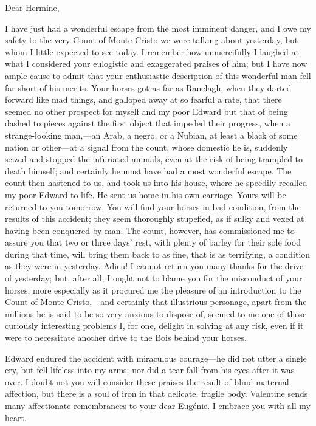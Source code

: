 \begin{mail}{}{Dear Hermine,}
	
	I have just had a wonderful escape from the most imminent danger, and I owe my safety to the very Count of Monte Cristo we were talking about yesterday, but whom I little expected to see today. I remember how unmercifully I laughed at what I considered your eulogistic and exaggerated praises of him; but I have now ample cause to admit that your enthusiastic description of this wonderful man fell far short of his merits. Your horses got as far as Ranelagh, when they darted forward like mad things, and galloped away at so fearful a rate, that there seemed no other prospect for myself and my poor Edward but that of being dashed to pieces against the first object that impeded their progress, when a strange-looking man,—an Arab, a negro, or a Nubian, at least a black of some nation or other—at a signal from the count, whose domestic he is, suddenly seized and stopped the infuriated animals, even at the risk of being trampled to death himself; and certainly he must have had a most wonderful escape. The count then hastened to us, and took us into his house, where he speedily recalled my poor Edward to life. He sent us home in his own carriage. Yours will be returned to you tomorrow. You will find your horses in bad condition, from the results of this accident; they seem thoroughly stupefied, as if sulky and vexed at having been conquered by man. The count, however, has commissioned me to assure you that two or three days' rest, with plenty of barley for their sole food during that time, will bring them back to as fine, that is as terrifying, a condition as they were in yesterday.  Adieu! I cannot return you many thanks for the drive of yesterday; but, after all, I ought not to blame you for the misconduct of your horses, more especially as it procured me the pleasure of an introduction to the Count of Monte Cristo,—and certainly that illustrious personage, apart from the millions he is said to be so very anxious to dispose of, seemed to me one of those curiously interesting problems I, for one, delight in solving at any risk, even if it were to necessitate another drive to the Bois behind your horses. 

 Edward endured the accident with miraculous courage—he did not utter a single cry, but fell lifeless into my arms; nor did a tear fall from his eyes after it was over. I doubt not you will consider these praises the result of blind maternal affection, but there is a soul of iron in that delicate, fragile body. Valentine sends many affectionate remembrances to your dear Eugénie. I embrace you with all my heart. 



\end{mail}

